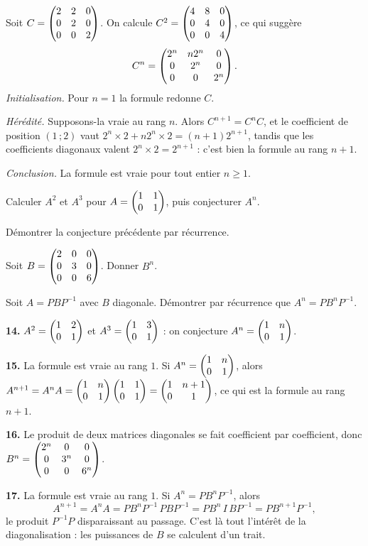 \begin{exemple}
Soit $C = \begin{pmatrix} 2 & 2 & 0 \\ 0 & 2 & 0 \\ 0 & 0 & 2 \end{pmatrix}$. On calcule
$C^{2} = \begin{pmatrix} 4 & 8 & 0 \\ 0 & 4 & 0 \\ 0 & 0 & 4 \end{pmatrix}$, ce qui suggère
\[
  C^{n} = \begin{pmatrix} 2^{n} & n2^{n} & 0 \\ 0 & 2^{n} & 0 \\ 0 & 0 & 2^{n} \end{pmatrix}.
\]
\emph{Initialisation.} Pour $n = 1$ la formule redonne $C$.

\emph{Hérédité.} Supposons-la vraie au rang $n$. Alors $C^{n+1} = C^{n}C$, et
le coefficient de position $(1\,;2)$ vaut
$2^{n}\times2+n2^{n}\times2 = (n+1)2^{n+1}$, tandis que les coefficients
diagonaux valent $2^{n}\times2 = 2^{n+1}$ : c'est bien la formule au rang
$n+1$.

\emph{Conclusion.} La formule est vraie pour tout entier $n \geq 1$.
\end{exemple}

\begin{entrainement}[puissances]
\exo[\niveau{1}] Calculer $A^{2}$ et $A^{3}$ pour
$A = \begin{pmatrix} 1 & 1 \\ 0 & 1 \end{pmatrix}$, puis conjecturer $A^{n}$.

\exo[\niveau{2}] Démontrer la conjecture précédente par récurrence.

\exo[\niveau{2}] Soit $B = \begin{pmatrix} 2 & 0 & 0 \\ 0 & 3 & 0 \\ 0 & 0 & 6 \end{pmatrix}$. Donner
$B^{n}$.

\exo[\niveau{3}] Soit $A = PBP^{-1}$ avec $B$ diagonale. Démontrer par
récurrence que $A^{n} = PB^{n}P^{-1}$.
\end{entrainement}

\begin{corrige}
\textbf{14.} $A^{2} = \begin{pmatrix} 1 & 2 \\ 0 & 1 \end{pmatrix}$ et $A^{3} = \begin{pmatrix} 1 & 3 \\ 0 & 1 \end{pmatrix}$ :
on conjecture $A^{n} = \begin{pmatrix} 1 & n \\ 0 & 1 \end{pmatrix}$.

\textbf{15.} La formule est vraie au rang $1$. Si $A^{n} = \begin{pmatrix} 1 & n \\ 0 & 1 \end{pmatrix}$,
alors
$A^{n+1} = A^{n}A = \begin{pmatrix} 1 & n \\ 0 & 1 \end{pmatrix}\begin{pmatrix} 1 & 1 \\ 0 & 1 \end{pmatrix}
= \begin{pmatrix} 1 & n+1 \\ 0 & 1 \end{pmatrix}$, ce qui est la formule au rang $n+1$.

\textbf{16.} Le produit de deux matrices diagonales se fait coefficient par
coefficient, donc
$B^{n} = \begin{pmatrix} 2^{n} & 0 & 0 \\ 0 & 3^{n} & 0 \\ 0 & 0 & 6^{n} \end{pmatrix}$.

\textbf{17.} La formule est vraie au rang $1$. Si $A^{n} = PB^{n}P^{-1}$,
alors
\[
  A^{n+1} = A^{n}A = PB^{n}P^{-1}\,PBP^{-1} = PB^{n}\,I\,BP^{-1}
  = PB^{n+1}P^{-1},
\]
le produit $P^{-1}P$ disparaissant au passage. C'est là tout l'intérêt de la
diagonalisation : les puissances de $B$ se calculent d'un trait.
\end{corrige}

